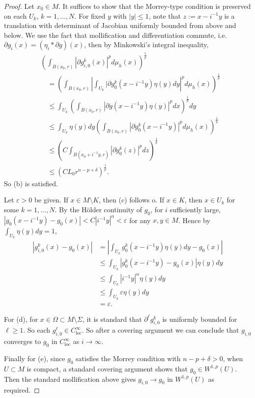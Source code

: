 \documentclass[12pt]{amsart}
\theoremstyle{plain}
\theoremstyle{plain}
\theoremstyle{definition}
\theoremstyle{remark}
\numberwithin{equation}{subsection}
\begin{document}
\begin{proof}
    Let $x_0 \in M$. It suffices to show that the Morrey-type condition is preserved on each $U_k$, $k = 1,\dots,N$. For fixed $y$ with $|y| \leq 1$, note that $z:= x-i^{-1}y$ is a translation with determinant of Jacobian uniformly bounded from above and below. We use the fact that mollification and differentiation commute, i.e. $\partial g_i(x) = (\eta_i \ast \partial g)(x)$, then by Minkowski's integral inequality,
    \begin{align*}
        &\left(\int_{B(x_0,r)}|\partial g_{i,0}^k(x)|^pd\mu_h(x)\right)^\frac{1}{p} \nonumber \\
        &\quad= \left(\int_{B(x_0,r)}\left|\int_{U_k} |\partial g_0^k(x-i^{-1}y)\eta(y)dy\right|^{p}d\mu_h(x)\right)^\frac{1}{p} \nonumber \\
        &\quad\leq \int_{U_k} \left(\int_{B(x_0,r)}|\partial g(x-i^{-1}y)\eta(y)|^pdx\right)^\frac{1}{p}dy \nonumber \\
        &\quad\leq \int_{U_k}\eta(y)dy\left(\int_{B(x_0,r)} |\partial g_0^k(x-i^{-1}y)|^p d\mu_h(x)\right)^\frac{1}{p} \nonumber \\
        &\quad\leq \left(C\int_{B(x_0 + i^{-1}y, r)} |\partial g_0^k(z)|^p dz\right)^\frac{1}{p} \nonumber \\
        &\quad\leq \left(CL_0 r^{n-p+\delta}\right)^\frac{1}{p}.
    \end{align*}
    So (b) is satisfied.
    
    Let $\varepsilon > 0$ be given. If $x \in M\setminus K$, then (c) follows o. If $x \in K$, then $x \in U_k$ for some $k = 1,\dots,N$. By the H\"older continuity of $g_0$, for $i$ sufficiently large, $|g_0(x-i^{-1}y) - g_0(x)| < C|i^{-1}y|^\alpha <\varepsilon$ for any $x, y \in M$. Hence by $\int_{U_k} \eta(y)dy = 1$,
    \begin{align*}
        |g_{i,0}^k(x) - g_0(x)| &= \left|\int_{U_k} g_0^k(x-i^{-1}y)\eta(y)dy - g_0(x)\right| \nonumber \\
        &\leq \int_{U_k} | g_0^k(x-i^{-1}y) - g_0(x)|\eta(y)dy \nonumber \\
        &\leq \int_{U_k} |i^{-1}y|^\alpha \eta(y)dy \nonumber \\
        &\leq \int_{U_k} \varepsilon \eta(y)dy \nonumber \\
        &= \varepsilon.
    \end{align*}
    
    For (d), for $x \in \Omega \subset M \setminus \Sigma$, it is standard that $\partial^\ell g_{i,0}^k$ is uniformly bounded for $\ell \geq 1$. So each $g_{i,0}^\ell \in C^\infty_\text{loc}$. So after a covering argument we can conclude that $g_{i,0}$ converges to $g_0$ in $C^\infty_\text{loc}$ as $i\to\infty$.
    
    Finally for (e), since $g_0$ satisfies the Morrey condition with $n - p + \delta > 0$, when $U \subset M$ is compact, a standard covering argument shows that $g_0 \in W^{1,p}(U)$. Then the standard mollification above gives $g_{i,0} \to g_0$ in $W^{1,p}(U)$ as required.
\end{proof}
\end{document}
